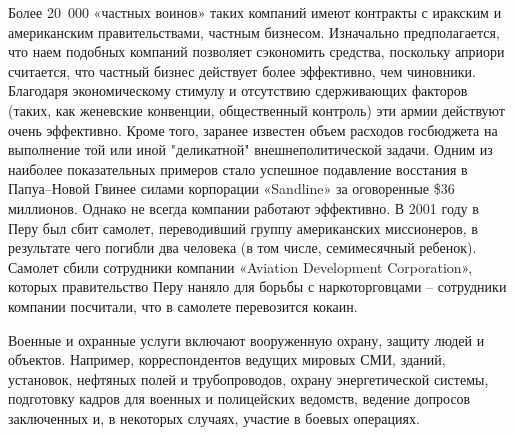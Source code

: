 \documentclass[a4paper,12pt,fleqn]{article} %
\begin{document}
Более 20 000 «частных воинов» таких компаний имеют контракты с иракским и американским правительствами, частным бизнесом. Изначально предполагается, что наем подобных компаний позволяет сэкономить средства, поскольку априори считается, что частный бизнес действует более эффективно, чем чиновники. Благодаря экономическому стимулу и отсутствию сдерживающих факторов (таких, как женевские конвенции, общественный контроль) эти армии действуют очень эффективно. Кроме того, заранее известен объем расходов госбюджета на выполнение той или иной "деликатной" внешнеполитической задачи. Одним из наиболее показательных примеров стало успешное подавление восстания в Папуа–Новой Гвинее силами корпорации «Sandline» за оговоренные \$36 миллионов. Однако не всегда компании работают эффективно. В 2001 году в Перу был сбит самолет, переводивший группу американских миссионеров, в результате чего погибли два человека (в том числе, семимесячный ребенок). Самолет сбили сотрудники компании «Aviation Development Corporation», которых правительство Перу наняло для борьбы с наркоторговцами – сотрудники компании посчитали, что в самолете перевозится кокаин. \\


Военные и охранные услуги включают вооруженную охрану, защиту людей и объектов. Например,  корреспондентов ведущих мировых СМИ, зданий, установок, нефтяных полей и трубопроводов, охрану энергетической системы, подготовку кадров для военных и полицейских ведомств, ведение допросов заключенных и, в некоторых случаях, участие в боевых операциях.\\
\end{document}
